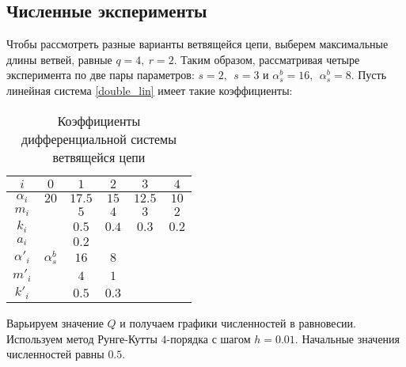 \subsection{Численные эксперименты}
Чтобы рассмотреть разные варианты ветвящейся цепи, выберем максимальные длины ветвей, равные \(q = 4, ~ r=2\). Таким образом, рассматривая четыре эксперимента по две пары параметров: \(s=2, ~~ s=3\) и \(\alpha^b_s = 16, ~~ \alpha^b_s = 8\). Пусть линейная система \eqref{double_lin} имеет такие коэффициенты:

\begin{table}[H]
    \centering
    \caption{Коэффициенты дифференциальной системы ветвящейся цепи}
    \begin{tabular}{|c|c|c|c|c|c|}
        \hline
        \(i\)        & \(0\) & \(1\) & \(2\) & \(3\) & \(4\) \\ \hline
        \(\alpha_i\)& \(20\) & \(17.5\) & \(15\) & \(12.5\) & \(10\) \\ \hline
        \(m_i\) &            & \(5\) & \(4\) & \(3\) & \(2\) \\ \hline
        \(k_i\) &            & \(0.5\) & \(0.4\) & \(0.3\) & \(0.2\) \\ \hline
        \(a_i\) &            & \(0.2\) &  &  &  \\ \hline \hline

        \(\alpha'_i\)& \(\alpha^b_s\) & \(16\) & \(8\) &  &  \\ \hline
        \(m'_i\) &            & \(4\) & \(1\) &  &  \\ \hline
        \(k'_i\) &            & \(0.5\) & \(0.3\) &  &  \\ \hline
    \end{tabular}
\end{table}

Варьируем значение \(Q\) и получаем графики численностей в равновесии. Используем метод Рунге-Кутты \(4\)-порядка с шагом \(h = 0.01\). Начальные значения численностей равны \(0.5\). 

